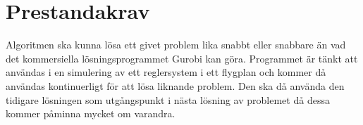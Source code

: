\section{Prestandakrav}
Algoritmen ska kunna lösa ett givet problem lika snabbt eller snabbare än vad det kommersiella lösningsprogrammet Gurobi kan göra. Programmet är tänkt att användas i en simulering av ett reglersystem i ett flygplan och kommer då användas kontinuerligt för att lösa liknande problem. Den ska då använda den tidigare lösningen som utgångspunkt i nästa lösning av problemet då dessa kommer påminna mycket om varandra.
\begin{LIPSkravlista}
\end{LIPSkravlista}
